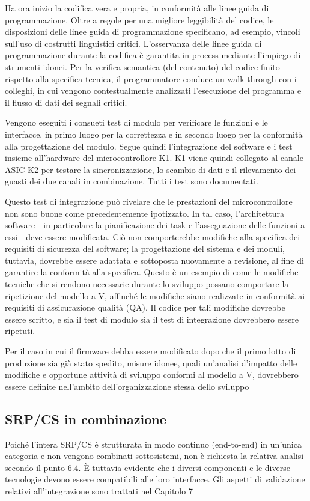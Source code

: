 Ha ora inizio la codifica vera e propria, in conformità alle linee guida di programmazione. Oltre a regole per una migliore leggibilità del codice, le disposizioni delle linee guida di programmazione specificano, ad esempio, vincoli sull'uso di costrutti linguistici critici. L'osservanza delle linee guida di programmazione durante la codifica è garantita in-process mediante l'impiego di strumenti idonei. Per la verifica semantica (del contenuto) del codice finito rispetto alla specifica tecnica, il programmatore conduce un walk-through con i colleghi, in cui vengono contestualmente analizzati l'esecuzione del programma e il flusso di dati dei segnali critici.

Vengono eseguiti i consueti test di modulo per verificare le funzioni e le interfacce, in primo luogo per la correttezza e in secondo luogo per la conformità alla progettazione del modulo. Segue quindi l'integrazione del software e i test insieme all'hardware del microcontrollore K1. K1 viene quindi collegato al canale ASIC K2 per testare la sincronizzazione, lo scambio di dati e il rilevamento dei guasti dei due canali in combinazione. Tutti i test sono documentati.

Questo test di integrazione può rivelare che le prestazioni del microcontrollore non sono buone come precedentemente ipotizzato. In tal caso, l'architettura software - in particolare la pianificazione dei task e l'assegnazione delle funzioni a essi - deve essere modificata. Ciò non comporterebbe modifiche alla specifica dei requisiti di sicurezza del software; la progettazione del sistema e dei moduli, tuttavia, dovrebbe essere adattata e sottoposta nuovamente a revisione, al fine di garantire la conformità alla specifica. Questo è un esempio di come le modifiche tecniche che si rendono necessarie durante lo sviluppo possano comportare la ripetizione del modello a V, affinché le modifiche siano realizzate in conformità ai requisiti di assicurazione qualità (QA). Il codice per tali modifiche dovrebbe essere scritto, e sia il test di modulo sia il test di integrazione dovrebbero essere ripetuti.

Per il caso in cui il firmware debba essere modificato dopo che il primo lotto di produzione sia già stato spedito, misure idonee, quali un'analisi d'impatto delle modifiche e opportune attività di sviluppo conformi al modello a V, dovrebbero essere definite nell'ambito dell'organizzazione stessa dello sviluppo

\subsection{SRP/CS in combinazione}
\label{subsec:06-5-10}
Poiché l'intera SRP/CS è strutturata in modo continuo (end-to-end) in un'unica categoria e non vengono combinati sottosistemi, non è richiesta la relativa analisi secondo il punto 6.4. È tuttavia evidente che i diversi componenti e le diverse tecnologie devono essere compatibili alle loro interfacce. Gli aspetti di validazione relativi all'integrazione sono trattati nel Capitolo 7

